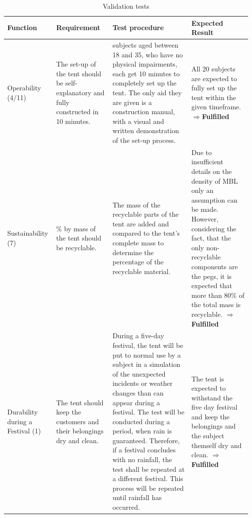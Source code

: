 \documentclass{article}
\begin{document}
\begin{table}[ht!]
    \caption{Validation tests}
    \label{tab:validation}
    \begin{tabularx}{\textwidth}{|>{\raggedright\arraybackslash}p{2.5cm}|>{\raggedright\arraybackslash}p{3.5cm}|>{\raggedright\arraybackslash}p{6cm}|>{\raggedright\arraybackslash}X|}
    \hline
    \rowcolor[gray]{0.75}
    \textbf{Function} & \textbf{Requirement} & \textbf{Test procedure} & \textbf{Expected Result} \\
    \hline
    Operability (4/11) & 
    The set-up of the tent should be self-explanatory and fully constructed in 10 minutes. & 
    20 subjects aged between 18 and 35, who have no physical impairments, each get 10 minutes to completely set up the tent. The only aid they are given is a construction manual, with a visual and written demonstration of the set-up process. &
    All 20 subjects are expected to fully set up the tent within the given timeframe. $\mathbf{\Rightarrow}$\textcolor{newgreen}{\textbf{Fulfilled}} \\
    \hline
    Sustainability (7) &
    80\% by mass of the tent should be recyclable. &
    The mass of the recyclable parts of the tent are added and compared to the tent’s complete mass to determine the percentage of the recyclable material. &
    Due to insufficient details on the density of MBL only an assumption can be made. However, considering the fact, that the only non-recyclable components are the pegs, it is expected that more than 80\% of the total mass is recyclable. $\mathbf{\Rightarrow}$\textcolor{newgreen}{\textbf{Fulfilled}} \\
    \hline
    Durability during a Festival (1) &
    The tent should keep the customers and their belongings dry and clean. &
    During a five-day festival, the tent will be put to normal use by a subject in a simulation of the unexpected incidents or weather changes than can appear during a festival. The test will be conducted during a period, when rain is guaranteed. Therefore, if a festival concludes with no rainfall, the test shall be repeated at a different festival. This process will be repeated until rainfall has occurred. &
    The tent is expected to withstand the five day festival and keep the belongings and the subject themself dry and clean. $\mathbf{\Rightarrow}$\textcolor{newgreen}{\textbf{Fulfilled}} \\
    \hline
    \end{tabularx}
\end{table}
\end{document}
